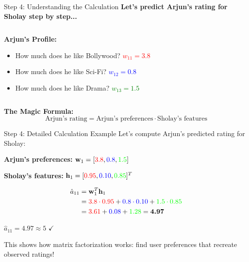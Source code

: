 \documentclass{beamer}
\begin{document}
\begin{frame}{Step 4: Understanding the Calculation}
\textbf{Let's predict Arjun's rating for Sholay step by step...}

\pause
\begin{columns}[T]
\begin{column}{0.5\textwidth}
\textbf{Arjun's Profile:}
\begin{itemize}[<+->]
    \item How much does he like Bollywood? \textcolor{red}{$w_{11} = 3.8$}
    \item How much does he like Sci-Fi? \textcolor{blue}{$w_{12} = 0.8$}
    \item How much does he like Drama? \textcolor{green}{$w_{13} = 1.5$}
\end{itemize}
\end{column}
\begin{column}{0.5\textwidth}
\end{column}
\end{columns}

\pause
\vspace{0.5cm}
\textbf{The Magic Formula:} 
$$\text{Arjun's rating} = \text{Arjun's preferences} \cdot \text{Sholay's features}$$
\end{frame}

\begin{frame}{Step 4: Detailed Calculation Example}
Let's compute Arjun's predicted rating for Sholay:

\pause
\textbf{Arjun's preferences:} $\mathbf{w}_1 = [\textcolor{red}{3.8}, \textcolor{blue}{0.8}, \textcolor{green}{1.5}]$

\textbf{Sholay's features:} $\mathbf{h}_1 = [\textcolor{red}{0.95}, \textcolor{blue}{0.10}, \textcolor{green}{0.85}]^T$

\pause
\begin{align}
\hat{a}_{11} &= \mathbf{w}_1^T \mathbf{h}_1 \\
&= \textcolor{red}{3.8 \cdot 0.95} + \textcolor{blue}{0.8 \cdot 0.10} + \textcolor{green}{1.5 \cdot 0.85} \\
&= \textcolor{red}{3.61} + \textcolor{blue}{0.08} + \textcolor{green}{1.28} = \textbf{4.97}
\end{align}

\pause $\hat{a}_{11} = 4.97 \approx 5$ $\checkmark$ 

This shows how matrix factorization works: find user preferences that recreate observed ratings!
\end{frame}
\end{document}
